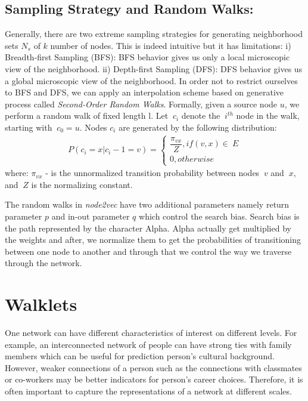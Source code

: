 \documentclass[a4paper,13pt]{article}
\begin{document}
\subsection{Sampling Strategy and Random Walks:}
Generally, there are two extreme sampling strategies for generating neighborhood sets $N_s$ of $k$ number of nodes. This is indeed intuitive but it has limitations: i) Breadth-first Sampling (BFS): BFS behavior gives us only a local microscopic view of the neighborhood. ii) Depth-first Sampling (DFS): DFS behavior gives us a global microscopic view of the neighborhood. In order not to restrict ourselves to BFS and DFS, we can apply an interpolation scheme based on generative process called \textit{Second-Order Random Walks}. Formally, given a source node $u$, we perform a random walk of fixed length l. Let $\ c_i $ denote the $\ i^{th} $  node in the walk, starting with $\ c_0 = u $. Nodes $ c_i $ are generated by the following distribution:
\begin{equation*}
\begin{aligned}
{P(c_i = x | c_i-1 = v)} = \begin{cases} \dfrac{\pi_{vx}}{{Z }}, if (v,x) \in\ E \\ 0, otherwise\end{cases}
\end{aligned}
\end{equation*}
where:
$\pi_{vx} $ - is the unnormalized transition probability between nodes $\ v $ and $\ x $, and $\ Z $ is the normalizing constant.

The random walks in \textit{node2vec} have two additional parameters namely return parameter $ p $ and in-out parameter $ q $ which control the search bias. Search bias is the path represented by the character Alpha. Alpha actually get multiplied by the weights and after, we normalize them to get the probabilities of transitioning between one node to another and through that we control the way we traverse through the network.

\section{Walklets~\cite{walklets}}
One network can have different characteristics of interest on different levels. For example, an interconnected network of people can have strong ties with family members which can be useful for prediction person's cultural background. However, weaker connections of a person such as the connections with classmates or co-workers may be better indicators for person's career choices. Therefore, it is often important to capture the representations of a network at different scales.
\end{document}

